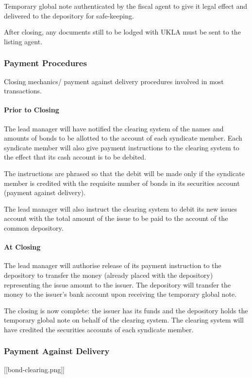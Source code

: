 \documentclass[
]{article}
\begin{document}
Temporary global note authenticated by the fiscal agent to give it legal
effect and delivered to the depository for safe-keeping.

After closing, any documents still to be lodged with UKLA must be sent
to the listing agent.

\hypertarget{payment-procedures}{%
\subsubsection{Payment Procedures}\label{payment-procedures}}

Closing mechanics/ payment against delivery procedures involved in most
transactions.

\hypertarget{prior-to-closing}{%
\paragraph{Prior to Closing}\label{prior-to-closing}}

The lead manager will have notified the clearing system of the names and
amounts of bonds to be allotted to the account of each syndicate member.
Each syndicate member will also give payment instructions to the
clearing system to the effect that its cash account is to be debited.

The instructions are phrased so that the debit will be made only if the
syndicate member is credited with the requisite number of bonds in its
securities account (payment against delivery).

The lead manager will also instruct the clearing system to debit its new
issues account with the total amount of the issue to be paid to the
account of the common depository.

\hypertarget{at-closing}{%
\paragraph{At Closing}\label{at-closing}}

The lead manager will authorise release of its payment instruction to
the depository to transfer the money (already placed with the
depository) representing the issue amount to the issuer. The depository
will transfer the money to the issuer's bank account upon receiving the
temporary global note.

The closing is now complete: the issuer has its funds and the depository
holds the temporary global note on behalf of the clearing system. The
clearing system will have credited the securities accounts of each
syndicate member.

\hypertarget{payment-against-delivery}{%
\subsubsection{Payment Against
Delivery}\label{payment-against-delivery}}

{[}{[}bond-clearing.png{]}{]}
\end{document}
